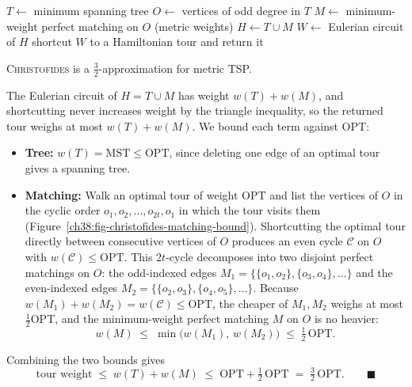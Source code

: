 \begin{algorithm}[H]
\caption{\textsc{Christofides}$(\Gph,w)$ -- metric}\label{ch38:alg-christofides}
\DontPrintSemicolon
$T \gets$ minimum spanning tree\;
$O \gets$ vertices of odd degree in $T$ 
$M \gets$ minimum-weight perfect matching on $O$ (metric weights)\;
$H \gets T \cup M$ 
$W \gets$ Eulerian circuit of $H$\;
shortcut $W$ to a Hamiltonian tour and return it\;
\end{algorithm}

\begin{theorem}\label{ch38:thm-christofides}
\textup{\textsc{Christofides}} is a $\tfrac32$-approximation for metric TSP.
\end{theorem}

\begin{whybox}
The Eulerian circuit of $H = T\cup M$ has weight $w(T)+w(M)$, and shortcutting never increases weight by
the triangle inequality, so the returned tour weighs at most $w(T)+w(M)$. We bound each term against $\mathrm{OPT}$:
\begin{itemize}
  \item \textbf{Tree:} $w(T) = \mathrm{MST} \le \mathrm{OPT}$, since deleting one edge of an optimal tour gives a spanning tree.
  \item \textbf{Matching:} Walk an optimal tour of weight $\mathrm{OPT}$ and list the vertices of $O$ in the cyclic order $o_1,o_2,\dots,o_{2t},o_1$ in which the tour visits them (Figure~\ref{ch38:fig-christofides-matching-bound}). Shortcutting the optimal tour directly between consecutive vertices of $O$ produces an even cycle $\mathcal{C}$ on $O$ with $w(\mathcal{C})\le\mathrm{OPT}$. This $2t$-cycle decomposes into two disjoint perfect matchings on $O$: the odd-indexed edges $M_1=\{\{o_1,o_2\},\{o_3,o_4\},\dots\}$ and the even-indexed edges $M_2=\{\{o_2,o_3\},\{o_4,o_5\},\dots\}$. Because $w(M_1)+w(M_2)=w(\mathcal{C})\le\mathrm{OPT}$, the cheaper of $M_1,M_2$ weighs at most $\tfrac12\mathrm{OPT}$, and the minimum-weight perfect matching $M$ on $O$ is no heavier:
  \[
    w(M) \;\le\; \min\bigl(w(M_1),\, w(M_2)\bigr) \;\le\; \tfrac12\,\mathrm{OPT}.
  \]
\end{itemize}
Combining the two bounds gives
\[
  \text{tour weight} \;\le\; w(T) + w(M) \;\le\; \mathrm{OPT} + \tfrac12\,\mathrm{OPT} \;=\; \tfrac32\,\mathrm{OPT}. \qquad\blacksquare
\]
\end{whybox}


